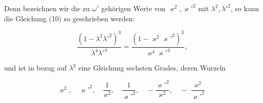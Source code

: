 

Denn bezeichnen wir die zu $\omega'$ geh\"origen Werte von $\varkappa^2,\varkappa'^2$ mit $\lambda^2,\lambda'^2$, so kann die Gleichung (10) so geschrieben werden:

\[
\frac{(1-\lambda^2\lambda'^2)^3}{\lambda^4\lambda'^4} = \frac{(1-\varkappa^2\varkappa'^2)^3}{\varkappa^4\varkappa'^4},
\]

und ist in bezug auf $\lambda^2$ eine Gleichung sechsten Grades, deren Wurzeln

\[
\varkappa^2, \quad \varkappa'^2, \quad \frac{1}{\varkappa^2}, \quad \frac{1}{\varkappa'^2}, \quad -\frac{\varkappa'^2}{\varkappa^2}, \quad -\frac{\varkappa^2}{\varkappa'^2}
\]
